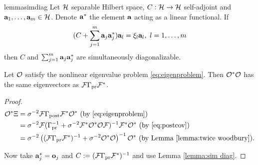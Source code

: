 

\begin{restatable*}{lemma}{simdiag}\label{lemma:sim diag}
  Let $\mathcal{H}$ separable Hilbert space, $C:\mathcal{H} \to \mathcal{H}$ self-adjoint
  and $\mathbf{a}_1,\dots,\mathbf{a}_m \in \mathcal{H}$. Denote $\mathbf{a}^*$ the element
  $\mathbf{a}$ acting as a linear functional. If
  \begin{equation*}
   (C + \sum_{j=1}^m \func_j\func_j^*) \func_l = \xi_l \func_l,\ l = 1,\dots,m
  \end{equation*}
  then $C$ and $\sum_{j=1}^m \mathbf{a}_j \mathbf{a}_j^*$ are simultaneously
  diagonalizable.
\end{restatable*}

\begin{corollary}\label{cor:same ev}
  Let $\mathcal{O}$ satisfy the nonlinear eigenvalue problem
  \eqref{eq:eigenproblem}. Then $\mathcal{O}^*\mathcal{O}$ has the same eigenvectors
  as $\mathcal{F} \Gamma_{\textup{pr}} \mathcal{F}^*$.
\end{corollary}
\begin{proof}
  \begin{align}\label{eq:mod conditions}
    \begin{split}
      \obs^* \Xi &= \sigma^{-2}\fwd \postcov \fwd^* \obs^*  \text{ (by \eqref{eq:eigenproblem})}\\
      &= \sigma^{-2} \fwd( \prcov^{-1} + \sigma^{-2}  \fwd^* \obs^* \obs \fwd )^{-1} \fwd^* \obs^*  \text{ (by \eqref{eq:postcov})} \\
      &= \sigma^{-2} \left ( (\fwd\prcov\fwd^*)^{-1} + \sigma^{-2}  \obs^* \obs \right )^{-1} \obs^* \text{ (by Lemma \ref{lemma:twice woodbury})}.
    \end{split}
  \end{align}

  Now take $\mathbf{a}_j^{*} = \mathbf{o}_j$ and $C := (\mathcal{F} \Gamma_{\textup{pr}}
  \mathcal{F}^*)^{-1}$ and use Lemma \ref{lemma:sim diag}.
\end{proof}

